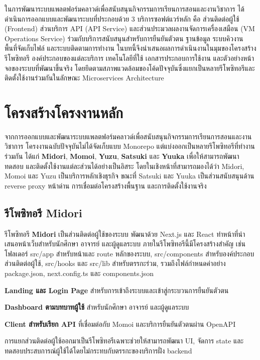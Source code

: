 
\hspace*{1.3em}
ในการพัฒนาระบบแพลตฟอร์มคลาวด์เพื่อสนับสนุนกิจกรรมการเรียนการสอนและงานวิชาการ ได้ดำเนินการออกแบบและพัฒนาระบบที่ประกอบด้วย 3 บริการซอฟต์แวร์หลัก คือ ส่วนติดต่อผู้ใช้ (Frontend) ส่วนบริการ API (API Service) และส่วนประมวลผลงานจัดการเครื่องเสมือน (VM Operations Service) ร่วมกับบริการสนับสนุนสำหรับการยืนยันตัวตน ฐานข้อมูล ระบบคิวงาน พื้นที่จัดเก็บไฟล์ และระบบติดตามการทำงาน
ในบทนี้จึงนำเสนอผลการดำเนินงานในมุมของโครงสร้างรีโพซิทอรี องค์ประกอบของแต่ละบริการ เทคโนโลยีที่ใช้ เอกสารประกอบการใช้งาน และตัวอย่างหน้าจอของระบบที่พัฒนาขึ้นจริง โดยยึดตามสภาพแวดล้อมของโค้ดปัจจุบันซึ่งแยกเป็นหลายรีโพซิทอรีและติดตั้งใช้งานร่วมกันในลักษณะ Microservices Architecture
\section{โครงสร้างโครงงานหลัก}
\hspace*{1.3em}
จากการออกแบบและพัฒนาระบบแพลตฟอร์มคลาวด์เพื่อสนับสนุนกิจกรรมการเรียนการสอนและงานวิชาการ โครงงานฉบับปัจจุบันไม่ได้จัดเก็บแบบ Monorepo แต่แบ่งออกเป็นหลายรีโพซิทอรีที่ทำงานร่วมกัน ได้แก่ \textbf{Midori}, \textbf{Momoi}, \textbf{Yuzu}, \textbf{Satsuki} และ \textbf{Yuuka} เพื่อให้สามารถพัฒนา ทดสอบ และติดตั้งใช้งานแต่ละส่วนได้อย่างเป็นอิสระ โดยในเชิงหน้าที่สามารถมองได้ว่า Midori, Momoi และ Yuzu เป็นบริการหลักเชิงธุรกิจ ขณะที่ Satsuki และ Yuuka เป็นส่วนสนับสนุนด้าน reverse proxy หน้าด่าน การเชื่อมต่อโครงสร้างพื้นฐาน และการติดตั้งใช้งานจริง

\subsection{รีโพซิทอรี Midori}
\hspace*{1.3em}
รีโพซิทอรี \textbf{Midori} เป็นส่วนติดต่อผู้ใช้ของระบบ พัฒนาด้วย Next.js และ React ทำหน้าที่นำเสนอหน้าเว็บสำหรับนักศึกษา อาจารย์ และผู้ดูแลระบบ ภายในรีโพซิทอรีนี้มีโครงสร้างสำคัญ เช่นโฟลเดอร์ src/app สำหรับหน้าและ route หลักของระบบ, src/components สำหรับองค์ประกอบส่วนติดต่อผู้ใช้, src/hooks และ src/lib สำหรับตรรกะร่วม, รวมถึงไฟล์กำหนดค่าอย่าง package.json, next.config.ts และ components.json
\begin{mycustomenum2}
    \item \textbf{Landing และ Login Page} สำหรับการเข้าถึงระบบและเข้าสู่กระบวนการยืนยันตัวตน
    \item \textbf{Dashboard ตามบทบาทผู้ใช้} สำหรับนักศึกษา อาจารย์ และผู้ดูแลระบบ
    \item \textbf{Client สำหรับเรียก API} ที่เชื่อมต่อกับ Momoi และบริการยืนยันตัวตนผ่าน OpenAPI
\end{mycustomenum2}
\newpage
\hspace*{1.3em}
การแยกส่วนติดต่อผู้ใช้ออกมาเป็นรีโพซิทอรีเฉพาะช่วยให้สามารถพัฒนา UI, จัดการ state และทดสอบประสบการณ์ผู้ใช้ได้โดยไม่กระทบกับตรรกะของบริการฝั่ง backend

